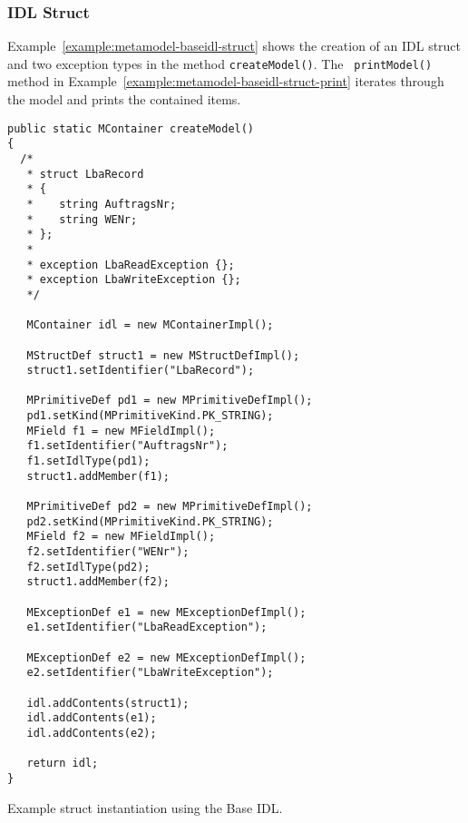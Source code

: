 \subsubsection{IDL Struct}

Example~\ref{example:metamodel-baseidl-struct} shows the creation of an IDL
struct and two exception types in the method {\tt createModel()}. The {\tt
printModel()} method in Example~\ref{example:metamodel-baseidl-struct-print}
iterates through the model and prints the contained items.

\begin{Example}
\begin{minifbox}
\begin{small}
\begin{verbatim}
public static MContainer createModel()
{
  /*
   * struct LbaRecord
   * {
   *    string AuftragsNr;
   *    string WENr;
   * };
   *
   * exception LbaReadException {};
   * exception LbaWriteException {};
   */

   MContainer idl = new MContainerImpl();

   MStructDef struct1 = new MStructDefImpl();
   struct1.setIdentifier("LbaRecord");

   MPrimitiveDef pd1 = new MPrimitiveDefImpl();
   pd1.setKind(MPrimitiveKind.PK_STRING);
   MField f1 = new MFieldImpl();
   f1.setIdentifier("AuftragsNr");
   f1.setIdlType(pd1);
   struct1.addMember(f1);

   MPrimitiveDef pd2 = new MPrimitiveDefImpl();
   pd2.setKind(MPrimitiveKind.PK_STRING);
   MField f2 = new MFieldImpl();
   f2.setIdentifier("WENr");
   f2.setIdlType(pd2);
   struct1.addMember(f2);

   MExceptionDef e1 = new MExceptionDefImpl();
   e1.setIdentifier("LbaReadException");

   MExceptionDef e2 = new MExceptionDefImpl();
   e2.setIdentifier("LbaWriteException");

   idl.addContents(struct1);
   idl.addContents(e1);
   idl.addContents(e2);

   return idl;
}
\end{verbatim}
\end{small}
\end{minifbox}
\caption{Example struct instantiation using the Base IDL.}
\label{example:metamodel-baseidl-struct}
\end{Example}

